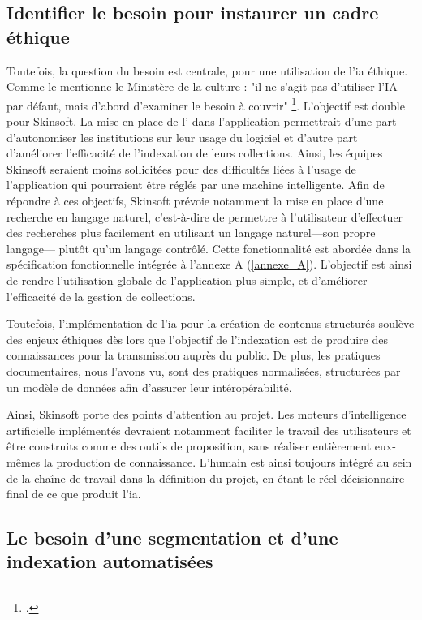 \subsection{Identifier le besoin pour instaurer un cadre éthique}

Toutefois, la question du besoin est centrale, pour une utilisation de l'\gls{ia} éthique. Comme le mentionne le Ministère de la culture : "il ne s’agit pas d’utiliser l’IA par défaut, mais d’abord d’examiner le besoin à couvrir" \footcite{2025a}. L'objectif est double pour Skinsoft. La mise en place de l' dans l'application permettrait d'une part d'autonomiser les institutions sur leur usage du logiciel et d'autre part d'améliorer l'efficacité de l'indexation de leurs collections. Ainsi, les équipes Skinsoft seraient moins sollicitées pour des difficultés liées à l'usage de l'application qui pourraient être réglés par une machine intelligente. Afin de répondre à ces objectifs, Skinsoft prévoie notamment la mise en place d'une recherche en langage naturel, c'est-à-dire de permettre à l'utilisateur d'effectuer des recherches plus facilement en utilisant un langage naturel---son propre langage--- plutôt qu'un langage contrôlé. Cette fonctionnalité est abordée dans la spécification fonctionnelle intégrée à l'annexe A (\ref{annexe_A}). L'objectif est ainsi de rendre l'utilisation globale de l'application plus simple, et d'améliorer l'efficacité de la gestion de collections. 

Toutefois, l'implémentation de l'\gls{ia} pour la création de contenus structurés soulève des enjeux éthiques dès lors que l'objectif de l'indexation est de produire des connaissances pour la transmission auprès du public. De plus, les pratiques documentaires, nous l'avons vu, sont des pratiques normalisées, structurées par un modèle de données afin d'assurer leur intéropérabilité.  

Ainsi, Skinsoft porte des points d'attention au projet. Les moteurs d'intelligence artificielle implémentés devraient notamment faciliter le travail des utilisateurs et être construits comme des outils de proposition, sans réaliser entièrement eux-mêmes la production de connaissance. L'humain est ainsi toujours intégré au sein de la chaîne de travail dans la définition du projet, en étant le réel décisionnaire final de ce que produit l'\gls{ia}.  

\subsection{Le besoin d'une segmentation et d'une indexation automatisées}

